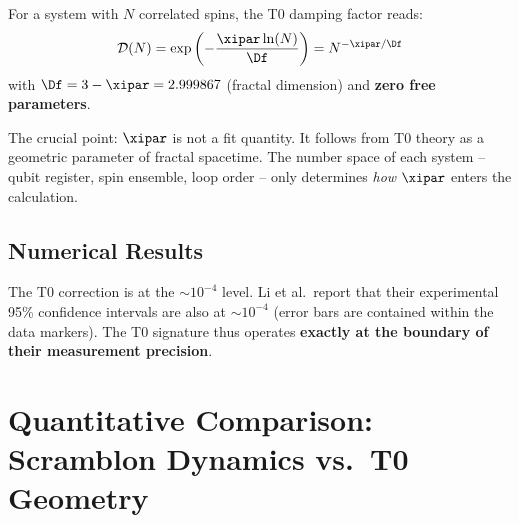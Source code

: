 \begin{definition}
	For a system with $N$ correlated spins, the T0 damping factor reads:
	\begin{equation}
		\mathcal{D}(N) = \exp\left(-\frac{\xipar \ln(N)}{\Df}\right) = N^{-\xipar/\Df}
		\label{eq:t0_damping}
	\end{equation}
	with $\Df = 3 - \xipar = 2.999867$ (fractal dimension) and \textbf{zero free parameters}.
\end{definition}

\begin{remark}
	The crucial point: $\xipar$ is not a fit quantity. It follows from T0 theory as a geometric parameter of fractal spacetime. The number space of each system -- qubit register, spin ensemble, loop order -- only determines \emph{how} $\xipar$ enters the calculation.
\end{remark}

\subsection{Numerical Results}

\begin{table}[h]
	\centering
	\caption{T0 damping factor for various effective cluster sizes in the adamantane system}
	\label{tab:t0_damping}
\end{table}

The T0 correction is at the $\sim 10^{-4}$ level. Li et al.\ report that their experimental 95\% confidence intervals are also at $\sim 10^{-4}$ (error bars are contained within the data markers). The T0 signature thus operates \textbf{exactly at the boundary of their measurement precision}.


\section{Quantitative Comparison: Scramblon Dynamics vs.\ T0 Geometry}
\label{sec:comparison}

